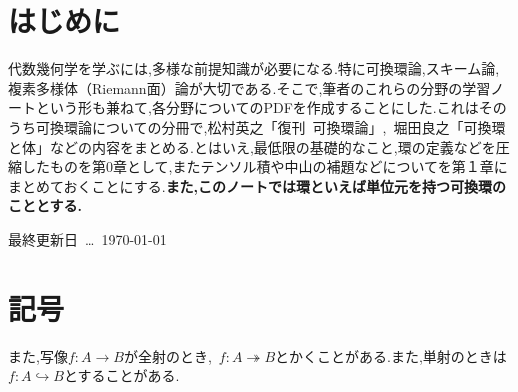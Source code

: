 \documentclass[autodetect-engine,dvi=dvipdfmx,ja=standard,japaram={units}]{bxjsarticle} %
\begin{document}
	\nocite{*}
	\newpage
	\part*{はじめに}
	代数幾何学を学ぶには,多様な前提知識が必要になる.特に可換環論,スキーム論,複素多様体（Riemann面）論が大切である.そこで,筆者のこれらの分野の学習ノートという形も兼ねて,各分野についてのPDFを作成することにした.これはそのうち可換環論についての分冊で,松村英之「復刊~可換環論」\cite{matsu},~堀田良之「可換環と体」\cite{hota2}などの内容をまとめる.とはいえ,最低限の基礎的なこと,環の定義などを圧縮したものを第0章として,またテンソル積や中山の補題などについてを第１章にまとめておくことにする.\textbf{また,このノートでは環といえば単位元を持つ可換環のこととする.}
	
	\hspace*{\fill}最終更新日~\dots~\today
	
	\part*{記号}
	
	
	また,写像$f:A\to B$が全射のとき,~$f:A\twoheadrightarrow B$とかくことがある.また,単射のときは$f:A\hookrightarrow B$とすることがある.
	\newpage
	
	\tableofcontents
	
	
	\def\prepartname{付録}
	\def\postpartname{}
	\thepartchange
%	 
	
	
	\printindex
	
	\newpage
	
	
\end{document}
